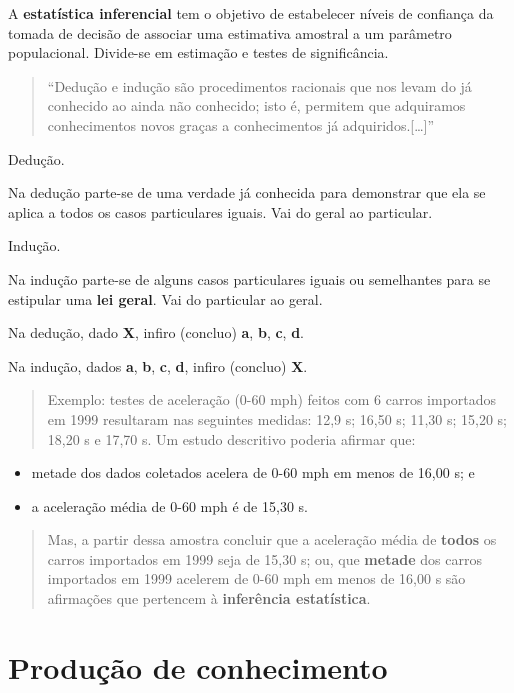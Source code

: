 \documentclass[
]{book}
\providecommand{\tightlist}{%
  \setlength{\itemsep}{0pt}\setlength{\parskip}{0pt}}
\begin{document}
A \textbf{estatística inferencial} tem o objetivo de estabelecer níveis de confiança da tomada de decisão de associar uma estimativa amostral a um parâmetro populacional. Divide-se em estimação e testes de significância.

\begin{quote}
``Dedução e indução são procedimentos racionais que nos levam do já conhecido ao ainda não conhecido; isto é, permitem que adquiramos conhecimentos novos graças a conhecimentos já adquiridos.{[}\ldots{]}''
\end{quote}

Dedução.

Na dedução parte-se de uma verdade já conhecida para demonstrar que ela se aplica a todos os casos particulares iguais. Vai do geral ao particular.

Indução.

Na indução parte-se de alguns casos particulares iguais ou semelhantes para se estipular uma \textbf{lei geral}. Vai do particular ao geral.

Na dedução, dado \textbf{X}, infiro (concluo) \textbf{a}, \textbf{b}, \textbf{c}, \textbf{d}.

Na indução, dados \textbf{a}, \textbf{b}, \textbf{c}, \textbf{d}, infiro (concluo) \textbf{X}.

\begin{quote}
Exemplo: testes de aceleração (0-60 mph) feitos com 6 carros importados em 1999 resultaram nas seguintes medidas: 12,9 s; 16,50 s; 11,30 s; 15,20 s; 18,20 s e 17,70 s. Um estudo descritivo poderia afirmar que:
\end{quote}

\begin{itemize}
\tightlist
\item
  metade dos dados coletados acelera de 0-60 mph em menos de 16,00 s; e
\item
  a aceleração média de 0-60 mph é de 15,30 s.
\end{itemize}

\begin{quote}
Mas, a partir dessa amostra concluir que a aceleração média de \textbf{todos} os carros importados em 1999 seja de 15,30 s; ou, que \textbf{metade} dos carros importados em 1999 acelerem de 0-60 mph em menos de 16,00 s são afirmações que pertencem à \textbf{inferência estatística}.
\end{quote}

\hypertarget{produuxe7uxe3o-de-conhecimento}{%
\section{Produção de conhecimento}\label{produuxe7uxe3o-de-conhecimento}}
\end{document}
